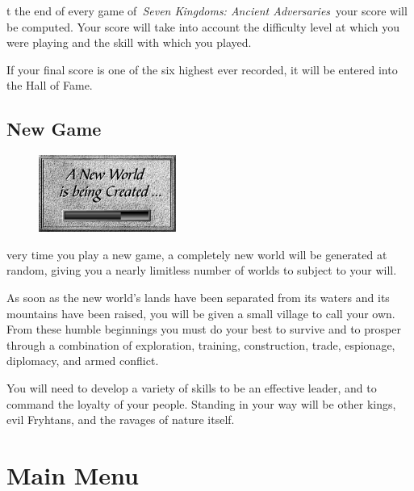 
t the end of every game of \textit{Seven Kingdoms: Ancient Adversaries} your score will be computed. Your score will take into account the difficulty level at which you were playing and the skill with which you played.

If your final score is one of the six highest ever recorded, it will be entered into the Hall of Fame.

\subsection{New Game}

\begin{figure}
	\begin{center}
		\vspace{-20pt}
		\includegraphics[width=0.4\textwidth]{Inewworld}
	\end{center}
\vspace{-20pt}
\end{figure}

very time you play a new game, a completely new world will be generated at random, giving you a nearly limitless number of worlds to subject to your will.

As soon as the new world’s lands have been separated from its waters and its mountains have been raised, you will be given a small village to call your own. From these humble beginnings you must do your best to survive and to prosper through a combination of exploration, training, construction, trade, espionage, diplomacy, and armed conflict.

You will need to develop a variety of skills to be an effective leader, and to command the loyalty of your people. Standing in your way will be other kings, evil Fryhtans, and the ravages of nature itself.

\section{Main Menu}


